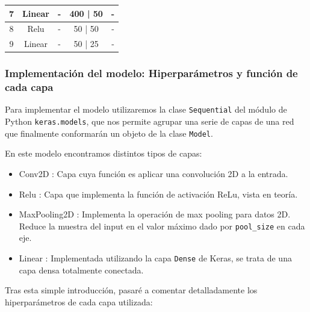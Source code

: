 \documentclass[12pt, spanish]{article}
\begin{document}
\begin{table}[H]
{\begin{tabular}{|c|c|c|c|c|}
7                       & Linear                & -                                                                                    & 400 | 50                          & -                                                                                                 \\ \hline
8                       & Relu                  & -                                                                                    & 50 | 50                           & -                                                                                                 \\ \hline
9                       & Linear                & -                                                                                    & 50 | 25                           & -                                                                                                 \\ \hline
\end{tabular}%
}
\end{table}


\subsubsection{Implementación del modelo: Hiperparámetros y función de cada capa}

Para implementar el modelo utilizaremos la clase \texttt{Sequential} del módulo de Python \texttt{keras.models}, que nos permite agrupar una serie de capas de una red que finalmente conformarán un objeto de la clase \texttt{Model}.

En este modelo encontramos distintos tipos de capas:

\begin{itemize}
	\item Conv2D\cite{conv2d} : Capa cuya función es aplicar una convolución 2D a la entrada.
	\item Relu\cite{relu} : Capa que implementa la función de activación ReLu, vista en teoría.
	\item MaxPooling2D\cite{maxpooling2d} : Implementa la operación de max pooling para datos 2D. Reduce la muestra del input en el valor máximo dado por \texttt{pool\_size} en cada eje.
	\item Linear : Implementada utilizando la capa \texttt{Dense}\cite{dense} de Keras, se trata de una capa densa totalmente conectada.
\end{itemize}

Tras esta simple introducción, pasaré a comentar detalladamente los hiperparámetros de cada capa utilizada:
\end{document}
